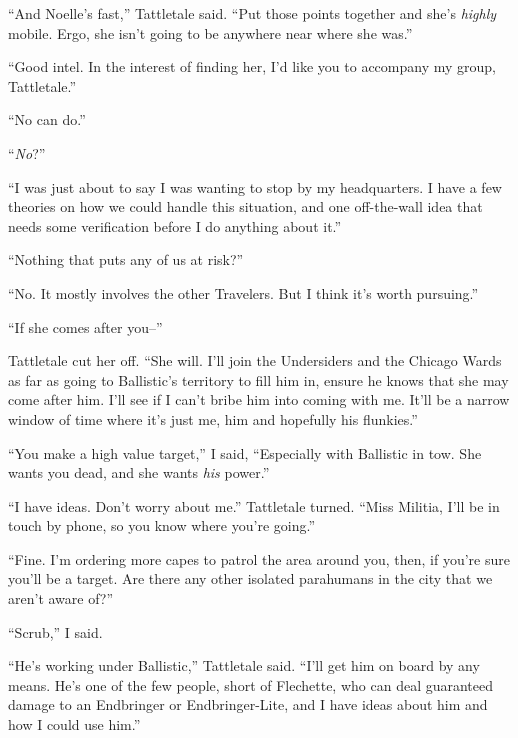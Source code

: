 ``And Noelle's fast,'' Tattletale said.  ``Put those points together and she's \emph{highly} mobile.  Ergo, she isn't going to be anywhere near where she was.''



``Good intel.  In the interest of finding her, I'd like you to accompany my group, Tattletale.''



``No can do.''



``\emph{No}?''



``I was just about to say I was wanting to stop by my headquarters.  I have a few theories on how we could handle this situation, and one off-the-wall idea that needs some verification before I do anything about it.''



``Nothing that puts any of us at risk?''



``No.  It mostly involves the other Travelers.  But I think it's worth pursuing.''



``If she comes after you--''



Tattletale cut her off.  ``She will.  I'll join the Undersiders and the Chicago Wards as far as going to Ballistic's territory to fill him in, ensure he knows that she may come after him.  I'll see if I can't bribe him into coming with me.  It'll be a narrow window of time where it's just me, him and hopefully his flunkies.''



``You make a high value target,'' I said, ``Especially with Ballistic in tow.  She wants you dead, and she wants \emph{his} power.''



``I have ideas.  Don't worry about me.'' Tattletale turned.  ``Miss Militia, I'll be in touch by phone, so you know where you're going.''



``Fine.  I'm ordering more capes to patrol the area around you, then, if you're sure you'll be a target.  Are there any other isolated parahumans in the city that we aren't aware of?''



``Scrub,'' I said.



``He's working under Ballistic,'' Tattletale said.  ``I'll get him on board by any means.  He's one of the few people, short of Flechette, who can deal guaranteed damage to an Endbringer or Endbringer-Lite, and I have ideas about him and how I could use him.''



